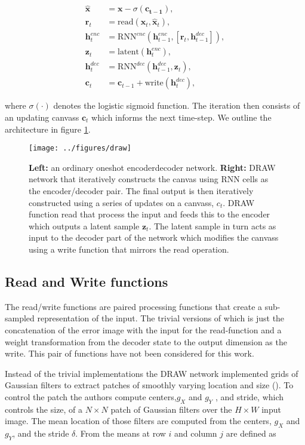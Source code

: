 \begin{align}
\hat{\mathbf{x}} &= \mathbf{x} - \sigma(\mathbf{c_{t-1}}), \\
\mathbf{r}_t &= \text{read}(\mathbf{x}_t, \hat{\mathbf{x}}_t ), \\
\mathbf{h}^{enc}_t &= \text{RNN}^{enc}( \mathbf{h}^{enc}_{t-1}, [\mathbf{r}_t, \mathbf{h}^{dec}_{t-1}]),\\
\mathbf{z}_t &= \text{latent}(\mathbf{h}^{enc}_t),\\
\mathbf{h}^{dec}_t &= \text{RNN}^{dec}( \mathbf{h}^{dec}_{t-1}, \mathbf{z}_t),\\
\mathbf{c}_t &= \mathbf{c}_{t-1} + \text{write}(\mathbf{h}_t^{dec}) \label{eq:draw},
\end{align} 

 \noindent where $\sigma(\cdot)$ denotes the logistic sigmoid function. The iteration then consists of an updating canvass $\mathbf{c}_t$ which informs the next time-step. We outline the architecture in figure \ref{fig:draw}.

\begin{figure}[h]
\centering
\texttt{[image: ../figures/draw]}
\caption[DRAW network architecture]{\textbf{Left:} an ordinary one\-shot encoder\-decoder network. \textbf{Right:} DRAW network that iteratively constructs the canvas using RNN cells as the encoder/decoder pair. The final output is then iteratively constructed using a series of updates on a canvass, $c_t$. DRAW function read that process the input and feeds this to the encoder which outputs a latent sample $\mathbf{z}_t$. The latent sample in turn acts as input to the decoder part of the network which modifies the canvass using a write function that mirrors the read operation.}\label{fig:draw}
\end{figure}
 
 \subsection{Read and Write functions}

 The read/write functions are paired processing functions that create a sub-sampled representation of the input. The trivial versions of which is just the concatenation of the error image with the input for the read-function and a weight transformation from the decoder state to the output dimension as the write. This pair of functions have not been considered for this work. 

 Instead of the trivial implementations the DRAW network implemented grids of Gaussian filters to extract patches of smoothly varying location and size (\cite{Gregor2015}). To control the patch the authors compute centers,$g_X$ and $g_Y$ , and stride, which controls the size, of a $N \times N$ patch of Gaussian filters over the $H \times W$ input image. The mean location of those filters are computed from the centers, $g_X$ and $g_Y$, and the stride $\delta$. From \citet{Gregor2015} the means at row $i$ and column $j$ are defined as 

